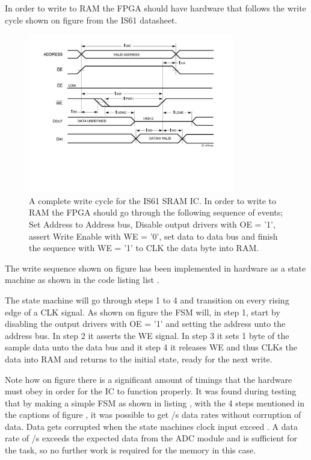 In order to write to RAM the FPGA should have hardware that follows the write cycle shown on figure  from the IS61 datasheet.
\begin{figure}[H]
    \centering
    \includegraphics[clip, trim=0 150 0 0, width=0.8\textwidth]{Sections/7_SystemDesign/Figures/7_2_5_IS61_WriteCycle.pdf}
    \caption{A complete write cycle for the IS61 SRAM IC\cite{ISSISRAM}. In order to write to RAM the FPGA should go through the following sequence of events; Set Address to Address bus, Disable output drivers with OE = '1', assert Write Enable with WE = '0', set data to data bus and finish the sequence with WE = '1' to CLK the data byte into RAM.}
    \label{fig:7_2_5_IS61_WRITE}
\end{figure}

The write sequence shown on figure  has been implemented in hardware as a state machine as shown in the code listing list .


The state machine will go through steps 1 to 4 and transition on every rising edge of a CLK signal. As shown on figure  the FSM will, in step 1, start by disabling the output drivers with OE = '1' and setting the address unto the address bus. In step 2 it asserts the WE signal. In step 3 it sets 1 byte of the sample data unto the data bus and it step 4 it releases WE and thus CLKs the data into RAM and returns to the initial state, ready for the next write.

Note how on figure  there is a significant amount of timings that the hardware must obey in order for the IC to function properly. It was found during testing that by making a simple FSM as shown in listing , with the 4 steps mentioned in the captions of figure , it was possible to get /s data rates without corruption of data. Data gets corrupted when the state machines clock input exceed . A data rate of /s exceeds the expected data from the ADC module and is sufficient for the task, so no further work is required for the memory in this case.

